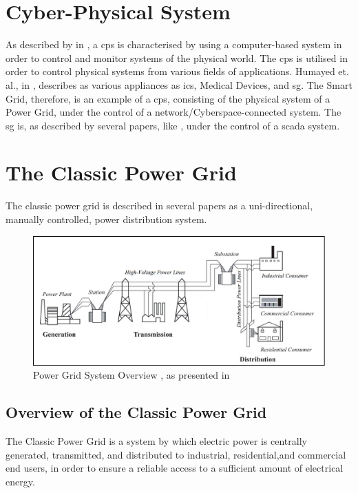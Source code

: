 \section{Cyber-Physical System}

As described by \citeauthor{humayed2017cyber} in \cite{humayed2017cyber}, a \acrfull{cps} is characterised by using a computer-based system in order to control and monitor systems of the physical world. The \acrshort{cps} is utilised in order to control physical systems from various fields of applications. Humayed et. al., in \cite{humayed2017cyber}, describes as various appliances as \acrfull{ics}, Medical Devices, and \acrlong{sg}.
The Smart Grid, therefore, is an example of a \acrfull{cps}, consisting of the physical system of a Power Grid, under the control of a network/Cyberspace-connected system. 
The \acrshort{sg} is, as described by several papers, like \cite{humayed2017cyber}%
, under the control of a \acrfull{scada} system.




\section{The Classic Power Grid }
The classic power grid is described in several papers as  a uni-directional, manually controlled, power distribution system.  

\begin{figure}[ht]
\includegraphics[width=\linewidth]{figures/Blume-PowerGrid-SystemOverView.png}
\caption[Power Grid System Overview]{Power Grid System Overview , as presented in \cite{BlumeStevenW2007Epsb}}
\label{fig:Blume-PowerGrid-SystemOverView}
\end{figure}



\subsection{Overview of the Classic Power Grid}
The Classic Power Grid is a system by which electric power is centrally generated, transmitted, and distributed to industrial, residential,and commercial end users, in order to ensure a reliable access to a sufficient amount of electrical energy. 

